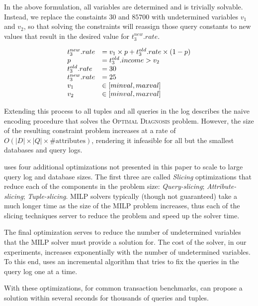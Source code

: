 In the above formulation, all variables are determined and is trivially
solvable.  Instead, we replace
the constaints $30$ and $85700$ with undetermined variables $v_1$ and $v_2$,
so that solving the constraints will reassign those query constants 
to new values that result in the desired value for $t_3^{new}.rate$.  

\[
\begin{array}{l l l}
t_3^{new}.rate &= v_1\times p + t_3^{old}.rate\times (1-p)\\
p              &= t_3^{old}.income > v_2\\
t_3^{old}.rate &= 30 \\
t_3^{new}.rate &= 25 \\
v_1            &\in [minval, maxval]\\
v_2            &\in [minval, maxval]\\
\end{array}
\]

Extending this process to all tuples and all queries in the log 
describes the naive encoding procedure that solves the
\textsc{Optimal Diagnosis} problem.
However, the size of the resulting constraint problem increases 
at a rate of $O(|D|\times |Q|\times \mathrm{\#attributes})$, rendering
it infeasible for all but the smallest databases and query logs.


\sys uses four additional optimizations not presented in this paper 
to scale to large query log and database sizes.  The first three are
called {\it Slicing} optimizations that reduce each of the components in the problem size:
{\it Query-slicing}; {\it Attribute-slicing}; {\it Tuple-slicing}. 
MILP solvers typically (though not guaranteed) take a much longer time as the size of the MILP problem increases, thus
each of the slicing techniques server to reduce the problem and speed up the solver time.

The final optimization serves to reduce the number of undetermined variables that the MILP solver must
provide a solution for.  The cost of the solver, in our experiments, increases exponentially with the number of 
undetermined variables.  To this end, \sys uses an incremental algorithm that tries to fix the queries in the query
log one at a time.

With these optimizations, for common transaction benchmarks, \sys can propose a solution within several seconds
for thousands of queries and tuples.


















